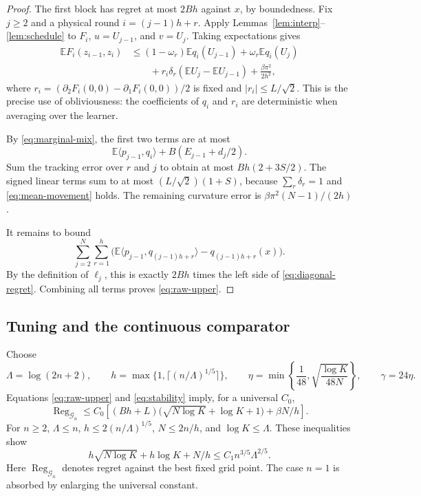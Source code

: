 \documentclass[11pt]{article}
\theoremstyle{definition}
\newcommand{\E}{\mathbb E}
\newcommand{\Reg}{\operatorname{Reg}}
\newcommand{\la}{\langle}
\newcommand{\ra}{\rangle}
\begin{document}
\begin{proof}
The first block has regret at most $2Bh$ against $x$, by boundedness. Fix $j\geq2$ and a physical round $i=(j-1)h+r$. Apply Lemmas~\ref{lem:interp}--\ref{lem:schedule} to $F_i$, $u=U_{j-1}$, and $v=U_j$. Taking expectations gives
\begin{align*}
 \E F_i(z_{i-1},z_i)
 &\leq(1-\omega_r)\E q_i(U_{j-1})+\omega_r\E q_i(U_j)\\
 &\qquad+r_i\delta_r(\E U_j-\E U_{j-1})
       +\frac{\beta\pi^2}{2h^2},
\end{align*}
where $r_i=(\partial_2 F_i(0,0)-\partial_1 F_i(0,0))/2$ is fixed and $|r_i|\leq L/\sqrt2$. This is the precise use of obliviousness: the coefficients of $q_i$ and $r_i$ are deterministic when averaging over the learner.

By \eqref{eq:marginal-mix}, the first two terms are at most
\[
 \E\la p_{j-1},q_i\ra+B(E_{j-1}+d_j/2).
\]
Sum the tracking error over $r$ and $j$ to obtain at most $Bh(2+3S/2)$. The signed linear terms sum to at most $(L/\sqrt2)(1+S)$, because $\sum_r\delta_r=1$ and \eqref{eq:mean-movement} holds. The remaining curvature error is $\beta\pi^2(N-1)/(2h)$.

It remains to bound
\[
 \sum_{j=2}^N\sum_{r=1}^h
  \bigl(\E\la p_{j-1},q_{(j-1)h+r}\ra-q_{(j-1)h+r}(x)\bigr).
\]
By the definition of $\ell_j$, this is exactly $2Bh$ times the left side of \eqref{eq:diagonal-regret}. Combining all terms proves \eqref{eq:raw-upper}.
\end{proof}

\subsection{Tuning and the continuous comparator}

Choose
\begin{equation}\label{eq:tuning}
 \Lambda=\log(2n+2),\qquad
 h=\max\{1,\lceil(n/\Lambda)^{1/5}\rceil\},\qquad
 \eta=\min\left\{\frac1{48},\sqrt{\frac{\log K}{48N}}\right\},
 \qquad\gamma=24\eta.
\end{equation}
Equations \eqref{eq:raw-upper} and \eqref{eq:stability} imply, for a universal $C_0$,
\begin{equation}\label{eq:upper-before-tune}
 \Reg_{\mathcal G_n}
 \leq C_0\left[(Bh+L)\bigl(\sqrt{N\log K}+\log K+1\bigr)
                 +\beta N/h\right].
\end{equation}
For $n\geq2$, $\Lambda\leq n$, $h\leq2(n/\Lambda)^{1/5}$, $N\leq2n/h$, and $\log K\leq\Lambda$. These inequalities show
\[
 h\sqrt{N\log K}+h\log K+N/h
 \leq C_1 n^{3/5}\Lambda^{2/5}.
\]
Here $\Reg_{\mathcal G_n}$ denotes regret against the best fixed grid point. The case $n=1$ is absorbed by enlarging the universal constant.
\end{document}

